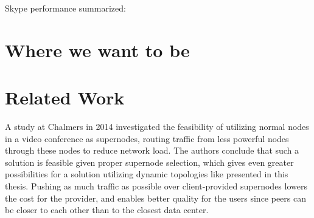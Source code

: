 Skype performance summarized:






\section{Where we want to be}



\section{Related Work}


A study at Chalmers in 2014\cite{tree-topology-webrtc} investigated the feasibility of utilizing normal nodes in a video conference as supernodes, routing traffic from less powerful nodes through these nodes to reduce network load. The authors conclude that such a solution is feasible given proper supernode selection, which gives even greater possibilities for a solution utilizing dynamic topologies like presented in this thesis. Pushing as much traffic as possible over client-provided supernodes lowers the cost for the provider, and enables better quality for the users since peers can be closer to each other than to the closest data center.
